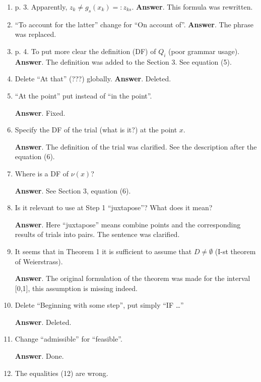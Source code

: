 \documentclass{article}%
\begin{document}
\begin{enumerate}
\item p. 3. Apparently, $z_k\neq g_s(x_k ) =:z_{ks}$.
\textbf{Answer}.
This formula was rewritten.

\item  “To account for the latter” change for “On account of”.
\textbf{Answer}.
The phrase was replaced.

\item  p. 4. To put more clear the definition (DF) of $Q_i$ (poor grammar usage).
\textbf{Answer}.
The definition was added to the Section 3. See equation (5).

\item  Delete “At that” (???) globally.
\textbf{Answer}.
Deleted.

\item “At the point” put instead of “in the point”.

\textbf{Answer}.
Fixed.

\item  Specify the DF of the trial (what is it?) at the point $x$.

\textbf{Answer}.
The definition of the trial was clarified. See the description after the equation (6).

\item  Where is a DF of $\nu(x)$?

\textbf{Answer}.
See Section 3, equation (6).

\item  Is it relevant to use at Step 1 “juxtapose”? What does it mean?

\textbf{Answer}.
Here “juxtapose” means combine points and the corresponding results of trials into pairs.
The sentence was clarified.

\item  It seems that in Theorem 1 it is sufficient to assume that $D\neq\emptyset$ (I-st theorem of Weierstrass).

\textbf{Answer}.
The original formulation of the theorem was made for the interval [0,1], this assumption is missing indeed.

\item  Delete “Beginning with some step”, put simply “IF …”

\textbf{Answer}.
Deleted.

\item  Change “admissible” for “feasible”.

\textbf{Answer}.
Done.

\item  The equalities (12) are wrong.


\end{enumerate}
\end{document}
